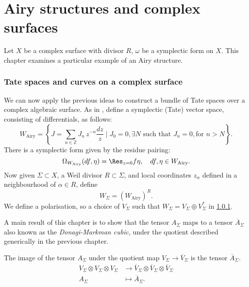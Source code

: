 \chapter{Airy structures and complex surfaces}

    Let \(X\) be a complex surface with divisor \(R\), \(\omega\) be a symplectic form on \(X\). This chapter examines a particular example of an Airy structure.

    \subsection{Tate spaces and curves on a complex surface}
    
    We can now apply the previous ideas to construct a bundle of Tate spaces over a complex algebraic surface. As in \cite{ks_airy}, define a symplectic (Tate) vector space, consisting of differentials, as follows:
    \[ W_{\text{Airy}}=\left\{ J=\sum_{n\in\mathbb{Z}} J_n \, z^{-n}\frac{dz}{z}\mid J_0=0, \exists N \text{ such that }J_n=0,\text{for }n>N\right\}.
    \]
    There is a symplectic form given by the residue pairing:
    \[ \Omega_{W_\text{Airy}}(df, \eta)=\Res_{z=0}f \eta,\quad df, \eta \in W_\text{Airy}.
    \]
    Now given \(\Sigma \subset X\), a Weil divisor \(R\subset\Sigma\), and local coordinates \(z_\alpha\) defined in a neighbourhood of \(\alpha\in R\), define \[W_\Sigma =(W_{\text{Airy}})^R.\]
    We define a polarisation, so a choice of \(V_\Sigma\) such that \(W_\Sigma = V_\Sigma \oplus V_\Sigma^*\) in \ref{}.
    
    A main result of this chapter is to show that the tensor \(A_\Sigma\) maps to a tensor \(\overline{A}_\Sigma\) also known as the \emph{Donagi-Markman cubic}, under the quotient described generically in the previous chapter.
    
    \begin{thm}  \label{main}
    The image of the tensor $A_\Sigma$ under the quotient map $V_\Sigma\to\overline{V}_\Sigma$  is the tensor $\overline{A}_\Sigma$.
    \begin{align}  \label{tensquot}
    V_\Sigma\otimes V_\Sigma\otimes V_\Sigma&\to\overline{V}_\Sigma\otimes\overline{V}_\Sigma\otimes\overline{V}_\Sigma\\
    A_\Sigma&\mapsto \overline{A}_\Sigma.\nonumber
    \end{align}
    \end{thm}

    
    
    
    
